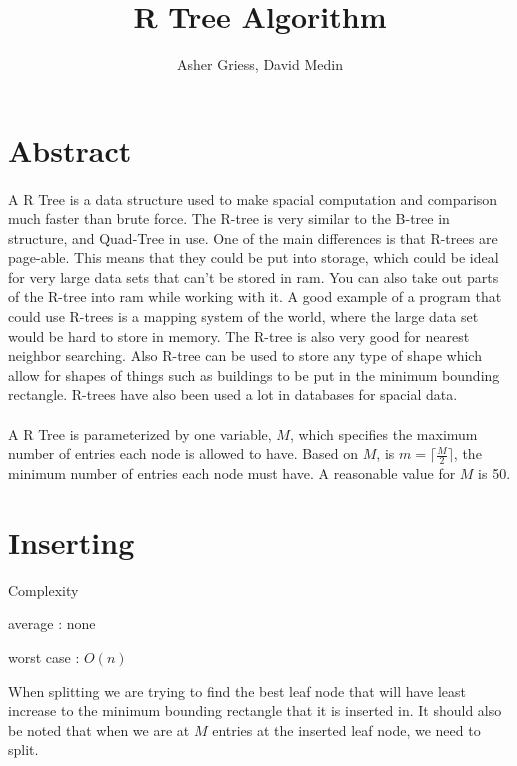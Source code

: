 \documentclass{article}
\author{Asher Griess, David Medin}
\title{R Tree Algorithm}
\begin{document}
\maketitle

\section{Abstract}
\paragraph{}
A R Tree is a data structure used to make spacial computation and comparison much faster than brute force.
The R-tree is very similar to the B-tree in structure, and Quad-Tree in use. One of the main differences is that
R-trees are page-able. This means that they could be put into storage, which could be ideal for very large data sets 
that can't be stored in ram.  You can also take out parts of the R-tree into ram while working with it. A good example
of a program that could use R-trees is a mapping system of the world, where the large data set would be hard to store in memory.
The R-tree is also very good for nearest neighbor searching. Also R-tree can be used to store any type of shape which allow for shapes
of things such as buildings to be put in the minimum bounding rectangle. R-trees have also been used a lot in databases for spacial data.
\paragraph{}
A R Tree is parameterized by one variable, $M$, which specifies the maximum number of entries each node is allowed to have. Based on $M$, is $m = \lceil\frac{M}{2}\rceil$, the minimum number of entries each node must have. A reasonable value for $M$ is 50. \cite{guttman_1984_rtrees}


\section{Inserting}
Complexity

average : none

worst case : $O(n)$

When splitting we are trying to find the best leaf node
that will have least increase to the minimum bounding rectangle that it is inserted in.
It should also be noted that when we are at $M$ entries at the inserted leaf node, we
need to split.
\end{document}
